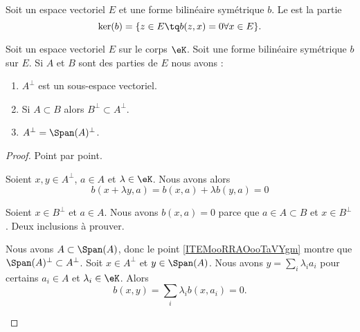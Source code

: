 \begin{definition}		\label{DEFooQQBQooKJdwxO}
	Soit un espace vectoriel \( E\) et une forme bilinéaire symétrique \( b\). Le  est la partie
	\begin{equation}
		\ker(b)=\{ z\in E\tq b(z,x)=0\forall x\in E \}.
	\end{equation}
\end{definition}

\begin{proposition}		\label{PROPooWPKRooUAnVzd}
	Soit un espace vectoriel \( E\) sur le corps \( \eK\). Soit une forme bilinéaire symétrique \( b\) sur \( E\). Si \( A\) et \( B\) sont des parties de \( E\) nous avons :
	\begin{enumerate}
		\item		\label{ITEMooCGEIooKpSNXS}
		      \( A^{\perp}\) est un sous-espace vectoriel.
		\item	\label{ITEMooRRAOooTaVYgm}
		      Si \( A\subset B\) alors \( B^{\perp}\subset A^{\perp}\).
		\item	\label{ITEMooBKXFooEpObWC}
		      \( A^{\perp}=\Span(A)^{\perp}\).
	\end{enumerate}
\end{proposition}

\begin{proof}
	Point par point.
	\begin{subproof}

		Soient \( x,y\in A^{\perp}\), \( a\in A\) et \( \lambda\in \eK\). Nous avons alors
		\begin{equation}
			b(x+\lambda y,a)=b(x,a)+\lambda b(y,a)=0
		\end{equation}


		Soient \( x\in B^{\perp}\) et \( a\in A\). Nous avons \( b(x,a)=0\) parce que \( a\in A\subset B\) et \( x\in B^{\perp}\).
		Deux inclusions à prouver.

		\begin{subproof}
			Nous avons \( A\subset \Span(A)\), donc le point \ref{ITEMooRRAOooTaVYgm} montre que \( \Span(A)^{\perp}\subset A^{\perp}\).
			Soit \( x\in A^{\perp}\) et \( y\in\Span(A)\). Nous avons \( y=\sum_i\lambda_ia_i\) pour certains \( a_i\in A\) et \( \lambda_i\in \eK\). Alors
			\begin{equation}
				b(x,y)=\sum_i\lambda_ib(x,a_i)=0.
			\end{equation}
		\end{subproof}
	\end{subproof}
\end{proof}



